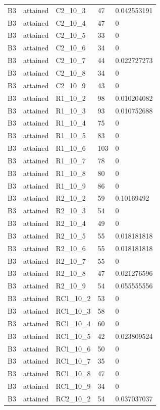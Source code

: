 \begin{longtable}{lllll}
B3 & attained & C2\_10\_3 & 47 & 0.042553191 \\
B3 & attained & C2\_10\_4 & 47 & 0 \\
B3 & attained & C2\_10\_5 & 33 & 0 \\
B3 & attained & C2\_10\_6 & 34 & 0 \\
B3 & attained & C2\_10\_7 & 44 & 0.022727273 \\
B3 & attained & C2\_10\_8 & 34 & 0 \\
B3 & attained & C2\_10\_9 & 43 & 0 \\
B3 & attained & R1\_10\_2 & 98 & 0.010204082 \\
B3 & attained & R1\_10\_3 & 93 & 0.010752688 \\
B3 & attained & R1\_10\_4 & 75 & 0 \\
B3 & attained & R1\_10\_5 & 83 & 0 \\
B3 & attained & R1\_10\_6 & 103 & 0 \\
B3 & attained & R1\_10\_7 & 78 & 0 \\
B3 & attained & R1\_10\_8 & 80 & 0 \\
B3 & attained & R1\_10\_9 & 86 & 0 \\
B3 & attained & R2\_10\_2 & 59 & 0.10169492 \\
B3 & attained & R2\_10\_3 & 54 & 0 \\
B3 & attained & R2\_10\_4 & 49 & 0 \\
B3 & attained & R2\_10\_5 & 55 & 0.018181818 \\
B3 & attained & R2\_10\_6 & 55 & 0.018181818 \\
B3 & attained & R2\_10\_7 & 55 & 0 \\
B3 & attained & R2\_10\_8 & 47 & 0.021276596 \\
B3 & attained & R2\_10\_9 & 54 & 0.055555556 \\
B3 & attained & RC1\_10\_2 & 53 & 0 \\
B3 & attained & RC1\_10\_3 & 58 & 0 \\
B3 & attained & RC1\_10\_4 & 60 & 0 \\
B3 & attained & RC1\_10\_5 & 42 & 0.023809524 \\
B3 & attained & RC1\_10\_6 & 50 & 0 \\
B3 & attained & RC1\_10\_7 & 35 & 0 \\
B3 & attained & RC1\_10\_8 & 47 & 0 \\
B3 & attained & RC1\_10\_9 & 34 & 0 \\
B3 & attained & RC2\_10\_2 & 54 & 0.037037037 \\

\end{longtable}
